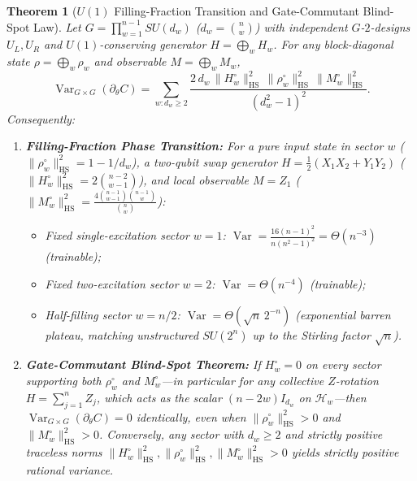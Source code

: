 \documentclass[11pt,a4paper]{article}
\newtheorem{theorem}{Theorem}[section]
\theoremstyle{definition}
\theoremstyle{remark}
\newcommand{\Var}{\operatorname{Var}}
\newcommand{\HS}{\mathrm{HS}}
\begin{document}
\begin{theorem}[$U(1)$ Filling-Fraction Transition and Gate-Commutant Blind-Spot Law]\label{thm:u1}
Let $G = \prod_{w=1}^{n-1} SU(d_w)$ ($d_w = \binom{n}{w}$) with independent $G$-$2$-designs $U_L, U_R$ and $U(1)$-conserving generator $H = \bigoplus_w H_w$. For any block-diagonal state $\rho = \bigoplus_w \rho_w$ and observable $M = \bigoplus_w M_w$,
\begin{equation}\label{eq:u1-exact}
  \Var_{G\times G}(\partial_\theta C)
  = \sum_{w : d_w \ge 2} \frac{2\, d_w\, \|H_w^\circ\|_{\HS}^2\, \|\rho_w^\circ\|_{\HS}^2\, \|M_w^\circ\|_{\HS}^2}{(d_w^2 - 1)^2}.
\end{equation}
Consequently:
\begin{enumerate}[leftmargin=1.8em,itemsep=2pt]
  \item \textbf{Filling-Fraction Phase Transition:} For a pure input state in sector $w$ ($\|\rho_w^\circ\|_{\HS}^2 = 1 - 1/d_w$), a two-qubit swap generator $H = \frac{1}{2}(X_1 X_2 + Y_1 Y_2)$ ($\|H_w^\circ\|_{\HS}^2 = 2\binom{n-2}{w-1}$), and local observable $M = Z_1$ ($\|M_w^\circ\|_{\HS}^2 = \frac{4\binom{n-1}{w-1}\binom{n-1}{w}}{\binom{n}{w}}$):
  \begin{itemize}[leftmargin=1.4em,itemsep=1pt]
    \item Fixed single-excitation sector $w=1$: $\Var = \frac{16(n-1)^2}{n(n^2-1)^2} = \Theta(n^{-3})$ (\emph{trainable});
    \item Fixed two-excitation sector $w=2$: $\Var = \Theta(n^{-4})$ (\emph{trainable});
    \item Half-filling sector $w = n/2$: $\Var = \Theta(\sqrt{n}\,2^{-n})$ (\emph{exponential barren plateau}, matching unstructured $SU(2^n)$ up to the Stirling factor $\sqrt{n}$).
  \end{itemize}
  \item \textbf{Gate-Commutant Blind-Spot Theorem:} If $H_w^\circ = 0$ on every sector supporting both $\rho_w^\circ$ and $M_w^\circ$---in particular for any collective $Z$-rotation $H = \sum_{j=1}^n Z_j$, which acts as the scalar $(n-2w)I_{d_w}$ on $\mathcal{H}_w$---then $\Var_{G\times G}(\partial_\theta C) = 0$ identically, even when $\|\rho_w^\circ\|_{\HS}^2 > 0$ and $\|M_w^\circ\|_{\HS}^2 > 0$. Conversely, any sector with $d_w \ge 2$ and strictly positive traceless norms $\|H_w^\circ\|_{\HS}^2, \|\rho_w^\circ\|_{\HS}^2, \|M_w^\circ\|_{\HS}^2 > 0$ yields strictly positive rational variance.
\end{enumerate}
\end{theorem}
\end{document}
